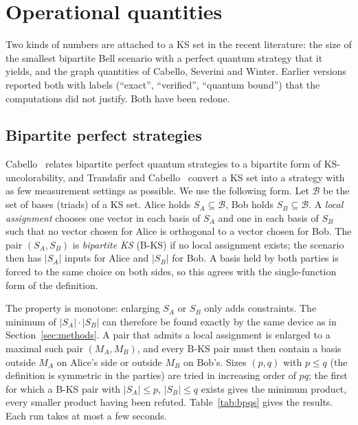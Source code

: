 \section{Operational quantities}\label{sec:operational}

Two kinds of numbers are attached to a KS set in the recent literature: the size of the smallest
bipartite Bell scenario with a perfect quantum strategy that it yields, and the graph quantities
of Cabello, Severini and Winter.  Earlier versions reported both with labels (``exact'',
``verified'', ``quantum bound'') that the computations did not justify.  Both have been redone.

\subsection{Bipartite perfect strategies}\label{sec:cabello}

Cabello~\cite{Cabello2024bipartite} relates bipartite perfect quantum strategies to a bipartite
form of KS-uncolorability, and Trandafir and Cabello~\cite{TrandafirCabello2025optimal} convert a
KS set into a strategy with as few measurement settings as possible.  We use the following form.
Let $\mathcal B$ be the set of bases (triads) of a KS set.  Alice holds $S_A\subseteq\mathcal B$,
Bob holds $S_B\subseteq\mathcal B$.  A \emph{local assignment} chooses one vector in each basis
of $S_A$ and one in each basis of $S_B$ such that no vector chosen for Alice is orthogonal to a
vector chosen for Bob.  The pair $(S_A,S_B)$ is \emph{bipartite KS} (B-KS) if no local assignment
exists; the scenario then has $|S_A|$ inputs for Alice and $|S_B|$ for Bob.  A basis held by both
parties is forced to the same choice on both sides, so this agrees with the single-function form
of the definition.

The property is monotone: enlarging $S_A$ or $S_B$ only adds constraints.  The minimum of
$|S_A|\cdot|S_B|$ can therefore be found exactly by the same device as in
Section~\ref{sec:methods}.  A pair that admits a local assignment is enlarged to a maximal such
pair $(M_A,M_B)$, and every B-KS pair must then contain a basis outside $M_A$ on Alice's side or
outside $M_B$ on Bob's.  Sizes $(p,q)$ with $p\le q$ (the definition is symmetric in the
parties) are tried in increasing order of $pq$; the first for which a B-KS pair with
$|S_A|\le p$, $|S_B|\le q$ exists gives the minimum product, every smaller product having been
refuted.  Table~\ref{tab:bpqs} gives the results.  Each run takes at most a few seconds.

